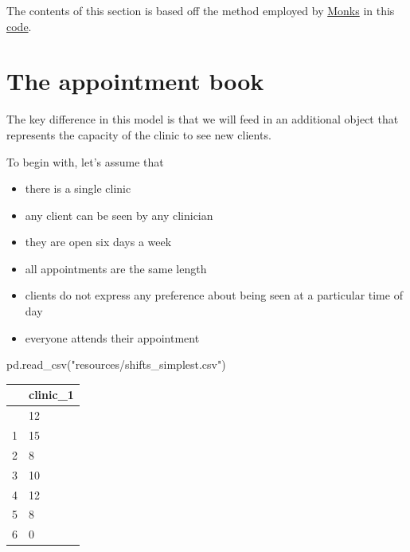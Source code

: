 \documentclass[
  letterpaper,
  DIV=11,
  numbers=noendperiod]{scrreprt}
\newenvironment{Shaded}{\begin{snugshade}}{\end{snugshade}}
\newcommand{\NormalTok}[1]{\textcolor[rgb]{0.00,0.23,0.31}{#1}}
\newcommand{\StringTok}[1]{\textcolor[rgb]{0.13,0.47,0.30}{#1}}
\providecommand{\tightlist}{%
  \setlength{\itemsep}{0pt}\setlength{\parskip}{0pt}}\usepackage{longtable,booktabs,array}
\begin{document}
\begin{tcolorbox}[enhanced jigsaw, rightrule=.15mm, colback=white, colframe=quarto-callout-note-color-frame, colbacktitle=quarto-callout-note-color!10!white, toprule=.15mm, coltitle=black, opacityback=0, titlerule=0mm, bottomtitle=1mm, breakable, title=\textcolor{quarto-callout-note-color}{\faInfo}\hspace{0.5em}{Note}, opacitybacktitle=0.6, toptitle=1mm, arc=.35mm, bottomrule=.15mm, leftrule=.75mm, left=2mm]

The contents of this section is based off the method employed by
\href{https://orcid.org/0000-0003-2631-4481}{Monks} in this
\href{https://github.com/health-data-science-OR/stochastic_systems/tree/master/labs/simulation/lab5}{code}.

\end{tcolorbox}

\section{The appointment book}\label{the-appointment-book}

The key difference in this model is that we will feed in an additional
object that represents the capacity of the clinic to see new clients.

To begin with, let's assume that

\begin{itemize}
\tightlist
\item
  there is a single clinic
\item
  any client can be seen by any clinician
\item
  they are open six days a week
\item
  all appointments are the same length
\item
  clients do not express any preference about being seen at a particular
  time of day
\item
  everyone attends their appointment
\end{itemize}

\begin{Shaded}
\begin{Highlighting}[]
\NormalTok{pd.read\_csv(}\StringTok{"resources/shifts\_simplest.csv"}\NormalTok{)}
\end{Highlighting}
\end{Shaded}

\begin{longtable}[]{@{}ll@{}}
\toprule\noalign{}
& clinic\_1 \\
\midrule\noalign{}
\endhead
\bottomrule\noalign{}
\endlastfoot
0 & 12 \\
1 & 15 \\
2 & 8 \\
3 & 10 \\
4 & 12 \\
5 & 8 \\
6 & 0 \\
\end{longtable}
\end{document}
